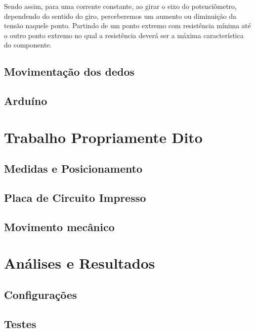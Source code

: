 \documentclass{../ufpatcc}
\begin{document}
		Sendo assim, para uma corrente constante, ao girar o eixo do potenciômetro, dependendo do sentido do giro, perceberemos um aumento ou diminuição da tensão naquele ponto. Partindo de um ponto extremo com resistência mínima até o outro ponto extremo no qual a resistência deverá ser a máxima característica do componente.

		\section{Movimentação dos dedos}

		\section{Arduíno}


	\chapter{Trabalho Propriamente Dito}
	
		\section{Medidas e Posicionamento}

		\section{Placa de Circuito Impresso}
		
		\section{Movimento mecânico}


	\chapter{Análises e Resultados}

		\section{Configurações}

		\section{Testes}
\end{document}
